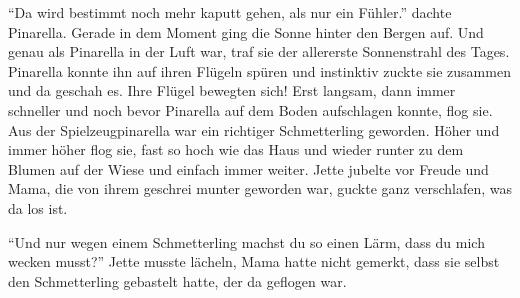 \enquote{Da wird bestimmt noch mehr kaputt gehen, als nur ein Fühler.} dachte Pinarella. Gerade in dem Moment ging die Sonne hinter den Bergen auf. Und genau als Pinarella in der Luft war, traf sie der allererste Sonnenstrahl des Tages. Pinarella konnte ihn auf ihren Flügeln spüren und instinktiv zuckte sie zusammen und da geschah es. Ihre Flügel bewegten sich! Erst langsam, dann immer schneller und noch bevor Pinarella auf dem Boden aufschlagen konnte, flog sie. Aus der Spielzeugpinarella war ein richtiger Schmetterling geworden. Höher und immer höher flog sie, fast so hoch wie das Haus und wieder runter zu dem Blumen auf der Wiese und einfach immer weiter. Jette jubelte vor Freude und Mama, die von ihrem geschrei munter geworden war, guckte ganz verschlafen, was da los ist.

\enquote{Und nur wegen einem Schmetterling machst du so einen Lärm, dass du mich wecken musst?} Jette musste lächeln, Mama hatte nicht gemerkt, dass sie selbst den Schmetterling gebastelt hatte, der da geflogen war. \hfill {\color{red}\decofourleft}
